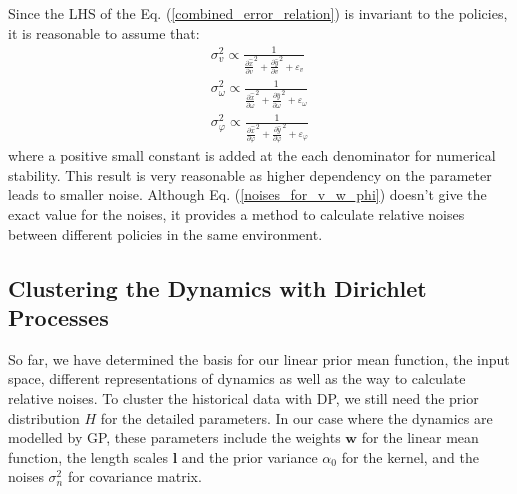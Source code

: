 Since the LHS of the Eq. (\ref{combined_error_relation}) is invariant to the policies, it is reasonable to assume that:
\begin{equation}
\begin{gathered}
\sigma_v^2 \propto
\frac{1}{
\frac{\partial \hat{x}}{\partial v}^2 
+ \frac{\partial \hat{y}}{\partial v}^2 + \varepsilon_v}
\\
\sigma_{\omega}^2 \propto
\frac{1}{
\frac{\partial \hat{x}}{\partial \omega}^2
+
\frac{\partial \hat{y}}{\partial \omega}^2 + \varepsilon_{\omega}} 
\\
\sigma_{\varphi}^2 \propto
\frac{1}{
\frac{\partial \hat{x}}{\partial \varphi}^2
+ 
\frac{\partial \hat{y}}{\partial \varphi}^2 + \varepsilon_{\varphi}} 
\end{gathered}
\label{noises_for_v_w_phi}
\end{equation}
where a positive small constant is added at the each denominator for numerical stability.
This result is very reasonable as higher dependency on the parameter leads to smaller noise.
Although Eq. (\ref{noises_for_v_w_phi}) doesn't give the exact value for the noises, it provides a method to calculate relative noises between different policies in the same environment.



\subsection{Clustering the Dynamics with Dirichlet Processes}
So far, we have determined the basis for our linear prior mean function, the input space, different representations of dynamics as well as the way to calculate relative noises.
To cluster the historical data with DP, we still need the prior distribution $H$ for the detailed parameters. 
In our case where the dynamics are modelled by GP, these parameters include the weights $\bm{w}$ for the linear mean function, the length scales $\bm{l}$ and the prior variance $\alpha_0$ for the kernel, and the noises $\sigma_{n}^2$ for covariance matrix.


